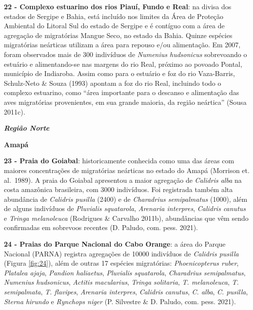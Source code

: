\documentclass[
  oneside]{scrbook}
\begin{document}
\textbf{22 - Complexo estuarino dos rios Piauí, Fundo e Real}: na divisa dos estados de Sergipe e Bahia, está incluído nos limites da Área de Proteção Ambiental do Litoral Sul do estado de Sergipe e é contíguo com a área de agregação de migratórias Mangue Seco, no estado da Bahia. Quinze espécies migratórias neárticas utilizam a área para repouso e/ou alimentação. Em 2007, foram observados mais de 300 indivíduos de \emph{Numenius hudsonicus} sobrevoando o estuário e alimentando-se nas margens do rio Real, próximo ao povoado Pontal, município de Indiaroba. Assim como para o estuário e foz do rio Vaza-Barris, Schulz-Neto \& Souza (1993) apontam a foz do rio Real, incluindo todo o complexo estuarino, como ``área importante para o descanso e alimentação das aves migratórias provenientes, em sua grande maioria, da região neártica'' (Sousa 2011c).

\textbf{\emph{Região Norte}}

\textbf{Amapá}

\textbf{23 - Praia do Goiabal}: historicamente conhecida como uma das áreas com maiores concentrações de migratórias neárticas no estado do Amapá (Morrison et. al.~1989). A praia do Goiabal apresentou a maior agregação de \emph{Calidris alba} na costa amazônica brasileira, com 3000 indivíduos. Foi registrada também alta abundância de \emph{Calidris pusilla} (2400) e de \emph{Charadrius semipalmatus} (1000), além de alguns indivíduos de \emph{Pluvialis squatarola}, \emph{Arenaria interpres}, \emph{Calidris canutus} e \emph{Tringa melanoleuca} (Rodrigues \& Carvalho 2011b), abundâncias que vêm sendo confirmadas em sobrevoos recentes (D. Paludo, com. pess. 2021).

\textbf{24 - Praias do Parque Nacional do Cabo Orange}: a área do Parque Nacional (PARNA) registra agregações de 10000 indivíduos de \emph{Calidris pusilla} (Figura \ref{fig:24}), além de outras 17 espécies migratórias: \emph{Phoenicopterus ruber}, \emph{Platalea ajaja}, \emph{Pandion haliaetus}, \emph{Pluvialis squatarola}, \emph{Charadrius semipalmatus}, \emph{Numenius hudsonicus}, \emph{Actitis macularius}, \emph{Tringa solitaria}, \emph{T. melanoleuca}, \emph{T. semipalmata}, \emph{T. flavipes}, \emph{Arenaria interpres}, \emph{Calidris canutus}, \emph{C. alba}, \emph{C. pusilla}, \emph{Sterna hirundo} e \emph{Rynchops niger} (P. Silvestre \& D. Paludo, com. pess. 2021).
\end{document}

